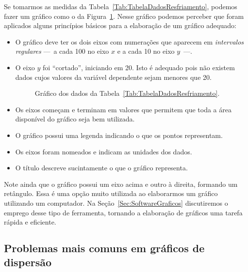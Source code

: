 Se tomarmos as medidas da Tabela~\ref{Tab:TabelaDadosResfriamento}, podemos fazer um gráfico como o da Figura~\ref{Fig:GraficoResfriamento}. Nesse gráfico podemos perceber que foram aplicados alguns princípios básicos para a elaboração de um gráfico adequado:
\begin{itemize}
	\item O gráfico deve ter os dois eixos com numerações que aparecem em \emph{intervalos regulares} ---~a cada 100 no eixo $x$ e a cada 10 no eixo $y$~---.
	\item O eixo $y$ foi ``cortado'', iniciando em 20. Isto é adequado pois não existem dados cujos valores da variável dependente sejam menores que 20.
	
\begin{figure}[!htb]
\centering
\caption{Gráfico dos dados da Tabela~\ref{Tab:TabelaDadosResfriamento}.\label{Fig:GraficoResfriamento}}

\end{figure}

	\item Os eixos começam e terminam em valores que permitem que toda a área disponível do gráfico seja bem utilizada.
	\item O gráfico possui uma legenda indicando o que os pontos representam.
	\item Os eixos foram nomeados e indicam as unidades dos dados.
	\item O título descreve sucintamente o que o gráfico representa.
\end{itemize}

\noindent{}Note ainda que o gráfico possui um eixo acima e outro à direita, formando um retângulo. Essa é uma opção muito utilizada ao elaborarmos um gráfico utilizando um computador. Na Seção~\ref{Sec:SoftwareGraficos} discutiremos o emprego desse tipo de ferramenta, tornando a elaboração de gráficos uma tarefa rápida e eficiente.

\subsection{Problemas mais comuns em gráficos de dispersão}

